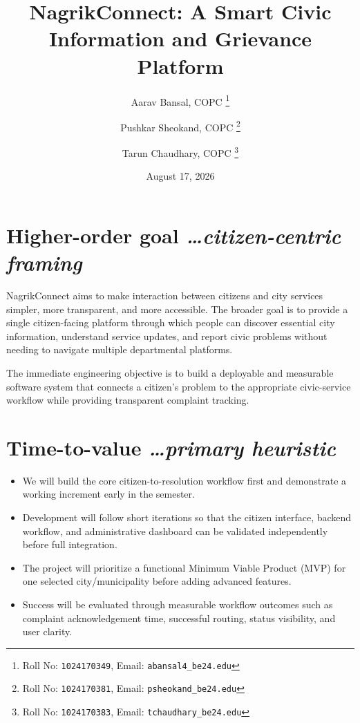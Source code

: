 \documentclass[11pt,a4paper]{article}
\title{NagrikConnect: A Smart Civic Information and Grievance Platform}
\author{
  Aarav Bansal, COPC%
  \thanks{Roll No: \texttt{1024170349}, Email: \texttt{abansal4\_be24\@thapar.edu}}
  \and
  Pushkar Sheokand, COPC%
  \thanks{Roll No: \texttt{1024170381}, Email: \texttt{psheokand\_be24\@thapar.edu}}
  \and
  Tarun Chaudhary, COPC%
  \thanks{Roll No: \texttt{1024170383}, Email: \texttt{tchaudhary\_be24\@thapar.edu}}
}
\date{August 17, 2026}
\newcommand{\BvrHint}[1]{{\normalfont\normalsize\itshape\hfill #1}}
\begin{document}
\maketitle

\section{Higher-order goal%
  \BvrHint{\ldots citizen-centric framing}}
NagrikConnect aims to make interaction between citizens and city services simpler, more transparent, and more accessible. The broader goal is to provide a single citizen-facing platform through which people can discover essential city information, understand service updates, and report civic problems without needing to navigate multiple departmental platforms.

The immediate engineering objective is to build a deployable and measurable software system that connects a citizen's problem to the appropriate civic-service workflow while providing transparent complaint tracking.

\section{Time-to-value %
\BvrHint{\ldots primary heuristic}}
\begin{itemize}[leftmargin=0.7cm]
    \item We will build the core citizen-to-resolution workflow first and demonstrate a working increment early in the semester.
    \item Development will follow short iterations so that the citizen interface, backend workflow, and administrative dashboard can be validated independently before full integration.
    \item The project will prioritize a functional Minimum Viable Product (MVP) for one selected city/municipality before adding advanced features.
    \item Success will be evaluated through measurable workflow outcomes such as complaint acknowledgement time, successful routing, status visibility, and user clarity.
\end{itemize}
\end{document}
